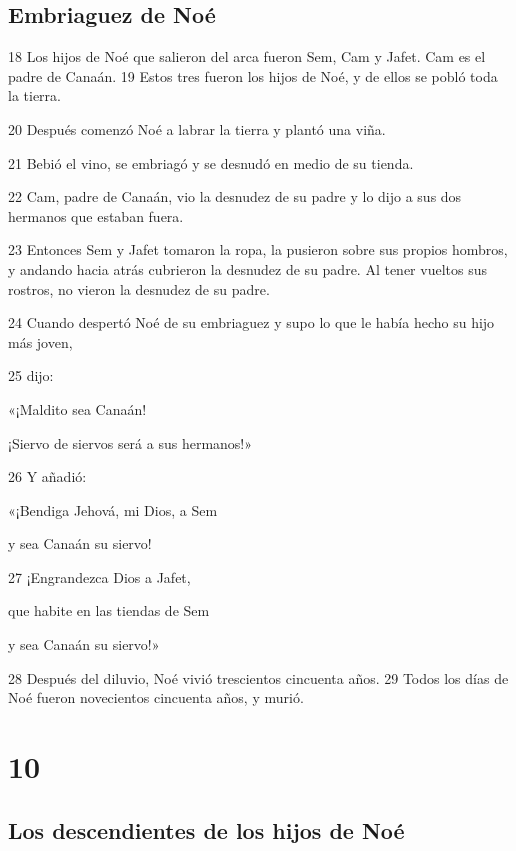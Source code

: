 \section*{Embriaguez de Noé}

\par 18 Los hijos de Noé que salieron del arca fueron Sem, Cam y Jafet. Cam es el padre de Canaán. 19 Estos tres fueron los hijos de Noé, y de ellos se pobló toda la tierra.
\par 20 Después comenzó Noé a labrar la tierra y plantó una viña.
\par 21 Bebió el vino, se embriagó y se desnudó en medio de su tienda.
\par 22 Cam, padre de Canaán, vio la desnudez de su padre y lo dijo a sus dos hermanos que estaban fuera.
\par 23 Entonces Sem y Jafet tomaron la ropa, la pusieron sobre sus propios hombros, y andando hacia atrás cubrieron la desnudez de su padre. Al tener vueltos sus rostros, no vieron la desnudez de su padre.
\par 24 Cuando despertó Noé de su embriaguez y supo lo que le había hecho su hijo más joven,
\par 25 dijo:
\par «¡Maldito sea Canaán!
\par ¡Siervo de siervos será a sus hermanos!»
\par 26 Y añadió:
\par «¡Bendiga Jehová, mi Dios, a Sem
\par y sea Canaán su siervo!
\par 27 ¡Engrandezca Dios a Jafet,
\par que habite en las tiendas de Sem
\par y sea Canaán su siervo!»
\par 28 Después del diluvio, Noé vivió trescientos cincuenta años. 29 Todos los días de Noé fueron novecientos cincuenta años, y murió.

\chapter{10}

\section*{Los descendientes de los hijos de Noé}

